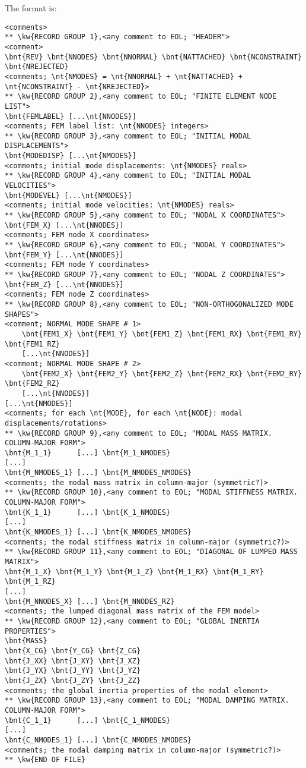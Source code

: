 The format is:
{\small
\begin{Verbatim}[commandchars=\\\{\}]
<comments>
** \kw{RECORD GROUP 1},<any comment to EOL; "HEADER">
<comment>
\bnt{REV} \bnt{NNODES} \bnt{NNORMAL} \bnt{NATTACHED} \bnt{NCONSTRAINT} \bnt{NREJECTED}
<comments; \nt{NMODES} = \nt{NNORMAL} + \nt{NATTACHED} + \nt{NCONSTRAINT} - \nt{NREJECTED}>
** \kw{RECORD GROUP 2},<any comment to EOL; "FINITE ELEMENT NODE LIST">
\bnt{FEMLABEL} [...\nt{NNODES}]
<comments; FEM label list: \nt{NNODES} integers>
** \kw{RECORD GROUP 3},<any comment to EOL; "INITIAL MODAL DISPLACEMENTS">
\bnt{MODEDISP} [...\nt{NMODES}]
<comments; initial mode displacements: \nt{NMODES} reals>
** \kw{RECORD GROUP 4},<any comment to EOL; "INITIAL MODAL VELOCITIES">
\bnt{MODEVEL} [...\nt{NMODES}]
<comments; initial mode velocities: \nt{NMODES} reals>
** \kw{RECORD GROUP 5},<any comment to EOL; "NODAL X COORDINATES">
\bnt{FEM_X} [...\nt{NNODES}]
<comments; FEM node X coordinates>
** \kw{RECORD GROUP 6},<any comment to EOL; "NODAL Y COORDINATES">
\bnt{FEM_Y} [...\nt{NNODES}]
<comments; FEM node Y coordinates>
** \kw{RECORD GROUP 7},<any comment to EOL; "NODAL Z COORDINATES">
\bnt{FEM_Z} [...\nt{NNODES}]
<comments; FEM node Z coordinates>
** \kw{RECORD GROUP 8},<any comment to EOL; "NON-ORTHOGONALIZED MODE SHAPES">
<comment; NORMAL MODE SHAPE # 1>
    \bnt{FEM1_X} \bnt{FEM1_Y} \bnt{FEM1_Z} \bnt{FEM1_RX} \bnt{FEM1_RY} \bnt{FEM1_RZ}
    [...\nt{NNODES}]
<comment; NORMAL MODE SHAPE # 2>
    \bnt{FEM2_X} \bnt{FEM2_Y} \bnt{FEM2_Z} \bnt{FEM2_RX} \bnt{FEM2_RY} \bnt{FEM2_RZ}
    [...\nt{NNODES}]
[...\nt{NMODES}]
<comments; for each \nt{MODE}, for each \nt{NODE}: modal displacements/rotations>
** \kw{RECORD GROUP 9},<any comment to EOL; "MODAL MASS MATRIX. COLUMN-MAJOR FORM">
\bnt{M_1_1}      [...] \bnt{M_1_NMODES}
[...]
\bnt{M_NMODES_1} [...] \bnt{M_NMODES_NMODES}
<comments; the modal mass matrix in column-major (symmetric?)>
** \kw{RECORD GROUP 10},<any comment to EOL; "MODAL STIFFNESS MATRIX. COLUMN-MAJOR FORM">
\bnt{K_1_1}      [...] \bnt{K_1_NMODES}
[...]
\bnt{K_NMODES_1} [...] \bnt{K_NMODES_NMODES}
<comments; the modal stiffness matrix in column-major (symmetric?)>
** \kw{RECORD GROUP 11},<any comment to EOL; "DIAGONAL OF LUMPED MASS MATRIX">
\bnt{M_1_X} \bnt{M_1_Y} \bnt{M_1_Z} \bnt{M_1_RX} \bnt{M_1_RY} \bnt{M_1_RZ}
[...]
\bnt{M_NNODES_X} [...] \bnt{M_NNODES_RZ}
<comments; the lumped diagonal mass matrix of the FEM model>
** \kw{RECORD GROUP 12},<any comment to EOL; "GLOBAL INERTIA PROPERTIES">
\bnt{MASS}
\bnt{X_CG} \bnt{Y_CG} \bnt{Z_CG}
\bnt{J_XX} \bnt{J_XY} \bnt{J_XZ}
\bnt{J_YX} \bnt{J_YY} \bnt{J_YZ}
\bnt{J_ZX} \bnt{J_ZY} \bnt{J_ZZ}
<comments; the global inertia properties of the modal element>
** \kw{RECORD GROUP 13},<any comment to EOL; "MODAL DAMPING MATRIX. COLUMN-MAJOR FORM">
\bnt{C_1_1}      [...] \bnt{C_1_NMODES}
[...]
\bnt{C_NMODES_1} [...] \bnt{C_NMODES_NMODES}
<comments; the modal damping matrix in column-major (symmetric?)>
** \kw{END OF FILE}
\end{Verbatim}
}

